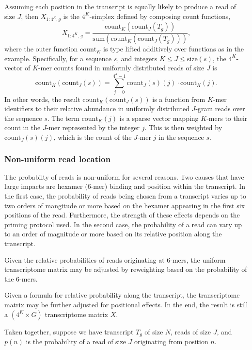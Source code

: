 \documentclass[11pt]{article}
\begin{document}
Assuming each position in the transcript is equally likely to produce
a read of size $J$, then $X_{1:4^K, g}$ is the $4^K$-simplex defined
by composing count functions,
\[
  X_{1:4^K, \, g}
  = \frac{\textrm{count}_K\left(\textrm{count}_J(T_g)\right)}
         {\textrm{sum}\left(\textrm{count}_K\left(\textrm{count}_J(T_g)\right)\right)},
\]
where the outer function $\textrm{count}_K$ is type lifted additively
over functions as in the example.  Specifically, for a sequence $s$,
and integers $K \leq J \leq \textrm{size}(s)$, the $4^K$-vector of
$K$-mer counts found in uniformly distributed reads of size $J$ is
\[
  \textrm{count}_K(\textrm{count}_J(s))
  = \sum_{j = 0}^{4^J - 1} \textrm{count}_J(s)(j) \cdot \textrm{count}_K(j).
\]
In other words, the result $\textrm{count}_K(\textrm{count}_J(s))$ is a
function from $K$-mer identifiers to their relative abundance in
uniformly distributed $J$-gram reads over the sequence $s$.  The term
$\textrm{count}_K(j)$ is a sparse vector mapping $K$-mers to their
count in the $J$-mer represented by the integer $j$.  This is then
weighted by $\textrm{count}_J(s)(j)$, which is the count of the $J$-mer $j$ in
the sequence $s$.

\subsubsection{Non-uniform read location}

The probabilty of reads is non-uniform for several reasons.  Two
causes that have large impacts are hexamer (6-mer) binding and
position within the transcript.  In the first case, the probability of
reads being chosen from a transcript varies up to two orders of
mangitude or more based on the hexamer appearing in the first six
positions of the read.  Furthermore, the strength of these effects
depends on the priming protocol used.  In the second case, the
probability of a read can vary up to an order of magnitude or more
based on its relative position along the transcript.

Given the relative probabilities of reads originating at 6-mers, the
uniform transcriptome matrix may be adjusted by reweighting based on
the probability of the 6-mers.

Given a formula for relative probability along the transcript, the
transcriptome matrix may be further adjusted for positional effects.
In the end, the result is still a $(4^K \times G)$ transcriptome
matrix $X$.

Taken together, suppose we have transcript $T_g$ of size $N$, reads
of size $J$, and $p(n)$ is the probability of a read of size $J$
originating from position $n$.
\end{document}
